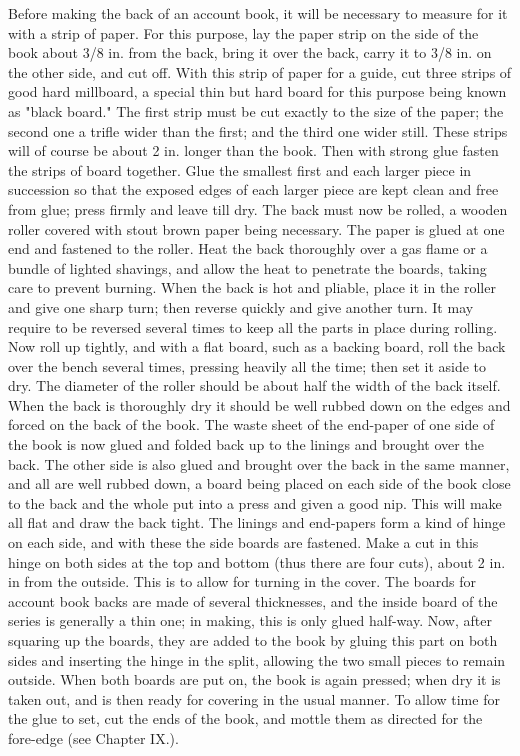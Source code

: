 \documentclass[twoside]{book}
\begin{document}
Before making the back of an account book, it
will be necessary to measure for it with a strip of
paper. For this purpose, lay the paper strip on the
side of the book about 3/8 in. from the back, bring it
over the back, carry it to 3/8 in. on the other side,
and cut off. With this strip of paper for a guide,
cut three strips of good hard millboard, a special
thin but hard board for this purpose being known
as "black board." The first strip must be cut
exactly to the size of the paper; the second one a
trifle wider than the first; and the third one wider
still. These strips will of course be about 2 in.
longer than the book. Then with strong glue fasten
the strips of board together. Glue the smallest
first and each larger piece in succession so that the
\pagebreak
exposed edges of each larger piece are kept clean
and free from glue; press firmly and leave till dry.
The back must now be rolled, a wooden roller
covered with stout brown paper being necessary.
The paper is glued at one end and fastened to the
roller. Heat the back thoroughly over a gas flame
or a bundle of lighted shavings, and allow the heat
to penetrate the boards, taking care to prevent
burning. When the back is hot and pliable, place
it in the roller and give one sharp turn; then
reverse quickly and give another turn. It may
require to be reversed several times to keep all the
parts in place during rolling. Now roll up tightly,
and with a flat board, such as a backing board, roll
the back over the bench several times, pressing
heavily all the time; then set it aside to dry. The
diameter of the roller should be about half the
width of the back itself. When the back is
thoroughly dry it should be well rubbed down on
the edges and forced on the back of the book.
The waste sheet of the end-paper of one side of
the book is now glued and folded back up to the
linings and brought over the back. The other side
is also glued and brought over the back in the same
manner, and all are well rubbed down, a board being
placed on each side of the book close to the back
and the whole put into a press and given a good nip.
This will make all flat and draw the back tight.
The linings and end-papers form a kind of hinge
on each side, and with these the side boards are
fastened. Make a cut in this hinge on both sides
at the top and bottom (thus there are four cuts),
about 2 in. in from the outside. This is to allow for
turning in the cover. The boards for account book
backs are made of several thicknesses, and the inside
board of the series is generally a thin one; in
making, this is only glued half-way. Now, after
squaring up the boards, they are added to the book
by gluing this part on both sides and inserting the
\pagebreak
hinge in the split, allowing the two small pieces
to remain outside. When both boards are put on,
the book is again pressed; when dry it is taken out,
and is then ready for covering in the usual manner.
To allow time for the glue to set, cut the ends
of the book, and mottle them as directed for the
fore-edge (see Chapter IX.).
\end{document}
